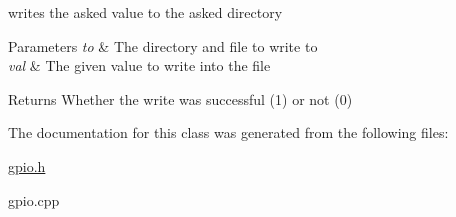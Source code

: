 writes the asked value to the asked directory 


\begin{DoxyParams}{Parameters}
{\em to} & The directory and file to write to \\
\hline
{\em val} & The given value to write into the file \\
\hline
\end{DoxyParams}
\begin{DoxyReturn}{Returns}
Whether the write was successful (1) or not (0) 
\end{DoxyReturn}


The documentation for this class was generated from the following files\+:\begin{DoxyCompactItemize}
\item 
\mbox{\hyperlink{gpio_8h}{gpio.\+h}}\item 
gpio.\+cpp\end{DoxyCompactItemize}
